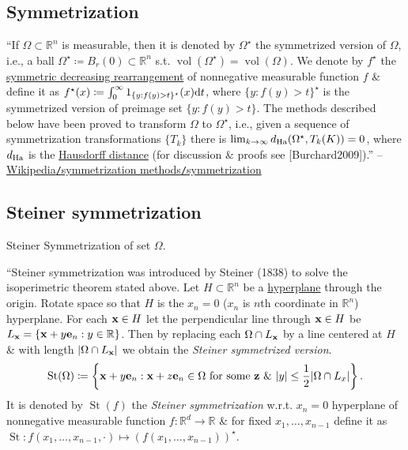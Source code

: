 \documentclass[oneside]{book}
\numberwithin{equation}{section}
\begin{document}
\subsection{Symmetrization}
``If $\Omega\subset\mathbb{R}^n$ is measurable, then it is denoted by $\Omega^\star$ the symmetrized version of $\Omega$, i.e., a ball $\Omega^\star\coloneqq B_r(0)\subset\mathbb{R}^n$ s.t. $\operatorname{vol}(\Omega^\star) = \operatorname{vol}(\Omega)$. We denote by $f^\star$ the \href{https://en.wikipedia.org/wiki/Symmetric_decreasing_rearrangement}{symmetric decreasing rearrangement} of nonnegative measurable function $f$ \& define it as $f^\star(x)\coloneqq\int_0^\infty 1_{\{y:f(y) > t\}^\star}(x){\rm d}t$, where $\{y:f(y) > t\}^\star$ is the symmetrized version of preimage set $\{y:f(y) > t\}$. The methods described below have been proved to transform $\Omega$ to $\Omega^\star$, i.e., given a sequence of symmetrization transformations $\{T_k\}$ there is $\lim_{k\to\infty} d_{\rm Ha}(\Omega^\star,T_k(K)) = 0$, where $d_{\rm Ha}$ is the \href{https://en.wikipedia.org/wiki/Hausdorff_distance}{Hausdorff distance} (for discussion \& proofs see [Burchard2009]).'' -- \href{https://en.wikipedia.org/wiki/Symmetrization_methods#Symmetrization}{Wikipedia\texttt{/}symmetrization methods\texttt{/}symmetrization}

\subsection{Steiner symmetrization}
\textsf{Steiner Symmetrization of set $\Omega$.}

``Steiner symmetrization was introduced by Steiner (1838) to solve the isoperimetric theorem stated above. Let $H\subset\mathbb{R}^n$ be a \href{https://en.wikipedia.org/wiki/Hyperplane}{hyperplane} through the origin. Rotate space so that $H$ is the $x_n = 0$ ($x_n$ is $n$th coordinate in $\mathbb{R}^n$) hyperplane. For each ${\bf x}\in H$ let the perpendicular line through ${\bf x}\in H$ be $L_{\bf x} = \{{\bf x} + y{\bf e}_n:y\in\mathbb{R}\}$. Then by replacing each $\Omega\cap L_{\bf x}$ by a line centered at $H$ \& with length $|\Omega\cap L_{\bf x}|$ we obtain the \textit{Steiner symmetrized version}.
\begin{align*}
	\operatorname{St}(\Omega)\coloneqq\left\{{\bf x} + y{\bf e}_n:{\bf x} + z{\bf e}_n\in\Omega\mbox{ for some }{\bf z}\mbox{ \& }|y|\le\frac{1}{2}|\Omega\cap L_x|\right\}.
\end{align*}
It is denoted by $\operatorname{St}(f)$ the \textit{Steiner symmetrization} w.r.t. $x_n = 0$ hyperplane of nonnegative measurable function $f:\mathbb{R}^d\to\mathbb{R}$ \& for fixed $x_1,\ldots,x_{n-1}$ define it as $\operatorname{St}:f(x_1,\ldots,x_{n-1},\cdot)\mapsto(f(x_1,\ldots,x_{n-1}))^\star$.
\end{document}
